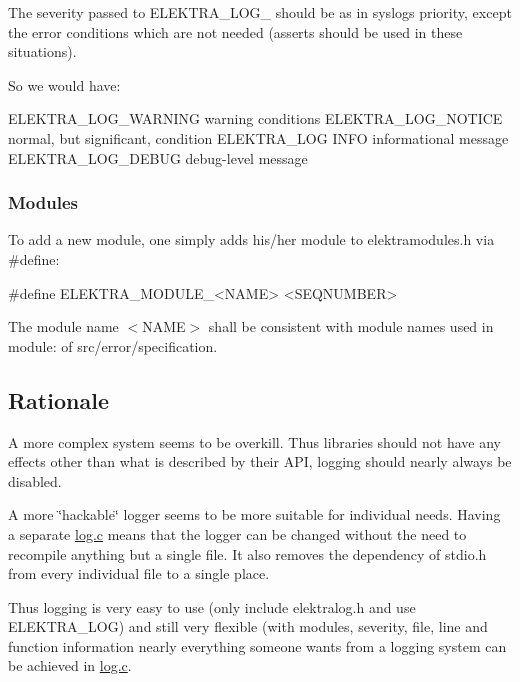 The severity passed to {\ttfamily E\+L\+E\+K\+T\+R\+A\+\_\+\+L\+O\+G\+\_\+} should be as in syslog\textquotesingle{}s priority, except the error conditions which are not needed (asserts should be used in these situations).

So we would have\+: \begin{DoxyVerb}    ELEKTRA_LOG_WARNING    warning conditions
    ELEKTRA_LOG_NOTICE     normal, but significant, condition
    ELEKTRA_LOG            INFO    informational message
    ELEKTRA_LOG_DEBUG      debug-level message
\end{DoxyVerb}


\subsubsection*{Modules}

To add a new module, one simply adds his/her module to {\ttfamily elektramodules.\+h} via {\ttfamily \#define}\+:


\begin{DoxyCode}
\textcolor{preprocessor}{#define ELEKTRA\_MODULE\_<NAME> <SEQNUMBER>}
\end{DoxyCode}


The module name {\ttfamily $<$N\+A\+ME$>$} shall be consistent with module names used in {\ttfamily module\+:} of {\ttfamily src/error/specification}.

\subsection*{Rationale}

A more complex system seems to be overkill. Thus libraries should not have any effects other than what is described by their A\+PI, logging should nearly always be disabled.

A more \char`\"{}hackable\char`\"{} logger seems to be more suitable for individual needs. Having a separate {\ttfamily \hyperlink{log_8c}{log.\+c}} means that the logger can be changed without the need to recompile anything but a single file. It also removes the dependency of {\ttfamily stdio.\+h} from every individual file to a single place.

Thus logging is very easy to use (only include {\ttfamily elektralog.\+h} and use {\ttfamily E\+L\+E\+K\+T\+R\+A\+\_\+\+L\+OG}) and still very flexible (with modules, severity, file, line and function information nearly everything someone wants from a logging system can be achieved in {\ttfamily \hyperlink{log_8c}{log.\+c}}.

